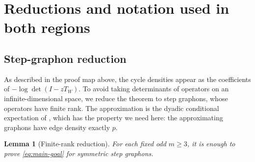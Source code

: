 \documentclass[11pt]{article}
\newtheorem{lemma}[theorem]{Lemma}
\numberwithin{equation}{section}
\begin{document}
\fi

\section{Reductions and notation used in both regions}\label{sec:common-operator}

\subsection{Step-graphon reduction}\label{subsec:step-reduction}

As described in the proof map above, the cycle densities appear as the coefficients of $-\log\det(I-zT_W)$.
To avoid taking determinants of operators on an infinite-dimensional space, we reduce the theorem to step graphons, whose operators have finite rank.
The approximation is the dyadic conditional expectation of \cite[Appendix~A.3.6]{Lovasz2012}, which has the property we need here: the approximating graphons have edge density exactly $p$.

\begin{lemma}[Finite-rank reduction]\label{lem:step-reduction}
  For each fixed odd $m\ge3$, it is enough to prove \eqref{eq:main-goal} for symmetric step graphons.
\end{lemma}
\end{document}
